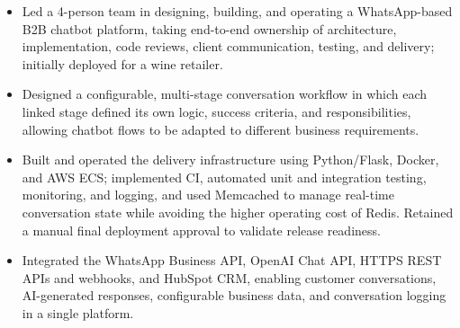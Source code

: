 

\begin{itemize}
  \item Led a 4-person team in designing, building, and operating a WhatsApp-based B2B chatbot platform, taking end-to-end ownership of architecture, implementation, code reviews, client communication, testing, and delivery; initially deployed for a wine retailer.
  \item Designed a configurable, multi-stage conversation workflow in which each linked stage defined its own logic, success criteria, and responsibilities, allowing chatbot flows to be adapted to different business requirements.
  \item Built and operated the delivery infrastructure using Python/Flask, Docker, and AWS ECS; implemented CI, automated unit and integration testing, monitoring, and logging, and used Memcached to manage real-time conversation state while avoiding the higher operating cost of Redis. Retained a manual final deployment approval to validate release readiness.
  \item Integrated the WhatsApp Business API, OpenAI Chat API, HTTPS REST APIs and webhooks, and HubSpot CRM, enabling customer conversations, AI-generated responses, configurable business data, and conversation logging in a single platform.
\end{itemize}


